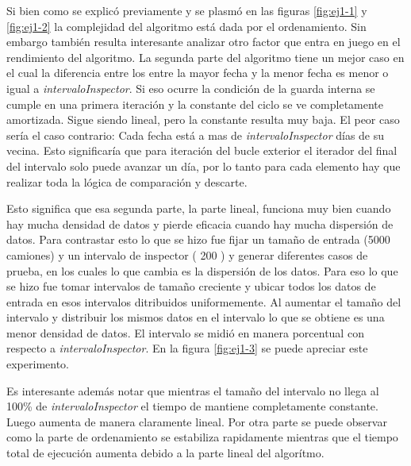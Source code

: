 \documentclass[11pt, a4paper, twoside]{article}
\begin{document}
Si bien como se explicó previamente y se plasmó en las figuras \ref{fig:ej1-1} y \ref{fig:ej1-2}
la complejidad del algoritmo está dada por el ordenamiento. Sin embargo también resulta interesante
analizar  otro factor que entra en juego en el rendimiento del algoritmo. La segunda parte
del algoritmo tiene un mejor caso en el cual la diferencia entre los entre la mayor fecha y la menor fecha
es menor o igual a \textit{intervaloInspector}. Si eso ocurre la condición de la guarda interna se cumple
en una primera iteración y la constante del ciclo se ve completamente amortizada. Sigue siendo lineal, pero
la constante resulta muy baja. El peor caso sería el caso contrario: Cada fecha está a mas de \textit{intervaloInspector}
días de su vecina. Esto significaría que para iteración del bucle exterior el iterador del final del intervalo 
solo puede avanzar un día, por lo tanto para cada elemento hay que realizar toda la lógica de comparación y descarte.

Esto significa que esa segunda parte, la parte lineal, funciona muy bien cuando hay mucha densidad de datos y pierde
eficacia cuando hay mucha dispersión de datos. Para contrastar esto lo que se hizo fue fijar un tamaño de entrada
(5000 camiones) y un intervalo de inspector ( 200 ) y generar diferentes casos de prueba, en los cuales lo que cambia
es la dispersión de los datos. Para eso lo que se hizo fue tomar intervalos de tamaño creciente y ubicar
todos los datos de entrada en esos intervalos ditribuidos uniformemente. Al aumentar el tamaño del intervalo
y distribuir los mismos datos en el intervalo lo que se obtiene es una menor densidad de datos. El intervalo
se midió en manera porcentual con respecto a \textit{intervaloInspector}. En la figura \ref{fig:ej1-3} se puede
apreciar este experimento.

Es interesante además notar que mientras el tamaño del intervalo no llega al 100\% de \textit{intervaloInspector}
el tiempo de mantiene completamente constante. Luego aumenta de manera claramente lineal. Por otra parte se puede
observar como la parte de ordenamiento se estabiliza rapidamente mientras que el tiempo total de ejecución aumenta debido
a la parte lineal del algorítmo.
\end{document}
